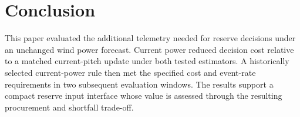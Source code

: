 \FloatBarrier
\section{Conclusion}

This paper evaluated the additional telemetry needed for reserve decisions under an unchanged wind power forecast. Current power reduced decision cost relative to a matched current-pitch update under both tested estimators. A historically selected current-power rule then met the specified cost and event-rate requirements in two subsequent evaluation windows. The results support a compact reserve input interface whose value is assessed through the resulting procurement and shortfall trade-off.
